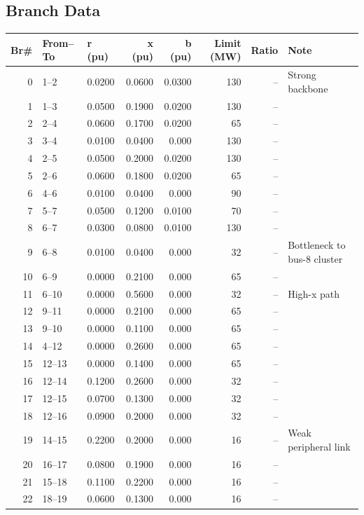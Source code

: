 \documentclass[11pt,a4paper]{article}
\begin{document}
\subsection{Branch Data}

\begin{tabular}{@{}rllrrrrl@{}}
\toprule
Br\# & From--To & r (pu) & x (pu) & b (pu) & Limit (MW) & Ratio & Note \\
\midrule
 0 & 1--2   & 0.0200 & 0.0600 & 0.0300 & 130 & -- & Strong backbone \\
 1 & 1--3   & 0.0500 & 0.1900 & 0.0200 & 130 & -- & \\
 2 & 2--4   & 0.0600 & 0.1700 & 0.0200 &  65 & -- & \\
 3 & 3--4   & 0.0100 & 0.0400 & 0.000  & 130 & -- & \\
 4 & 2--5   & 0.0500 & 0.2000 & 0.0200 & 130 & -- & \\
 5 & 2--6   & 0.0600 & 0.1800 & 0.0200 &  65 & -- & \\
 6 & 4--6   & 0.0100 & 0.0400 & 0.000  &  90 & -- & \\
 7 & 5--7   & 0.0500 & 0.1200 & 0.0100 &  70 & -- & \\
 8 & 6--7   & 0.0300 & 0.0800 & 0.0100 & 130 & -- & \\
 9 & 6--8   & 0.0100 & 0.0400 & 0.000  &  32 & -- & Bottleneck to bus-8 cluster \\
10 & 6--9   & 0.0000 & 0.2100 & 0.000  &  65 & -- & \\
11 & 6--10  & 0.0000 & 0.5600 & 0.000  &  32 & -- & High-x path \\
12 & 9--11  & 0.0000 & 0.2100 & 0.000  &  65 & -- & \\
13 & 9--10  & 0.0000 & 0.1100 & 0.000  &  65 & -- & \\
14 & 4--12  & 0.0000 & 0.2600 & 0.000  &  65 & -- & \\
15 & 12--13 & 0.0000 & 0.1400 & 0.000  &  65 & -- & \\
16 & 12--14 & 0.1200 & 0.2600 & 0.000  &  32 & -- & \\
17 & 12--15 & 0.0700 & 0.1300 & 0.000  &  32 & -- & \\
18 & 12--16 & 0.0900 & 0.2000 & 0.000  &  32 & -- & \\
19 & 14--15 & 0.2200 & 0.2000 & 0.000  &  16 & -- & Weak peripheral link \\
20 & 16--17 & 0.0800 & 0.1900 & 0.000  &  16 & -- & \\
21 & 15--18 & 0.1100 & 0.2200 & 0.000  &  16 & -- & \\
22 & 18--19 & 0.0600 & 0.1300 & 0.000  &  16 & -- & \\

\end{tabular}
\end{document}
